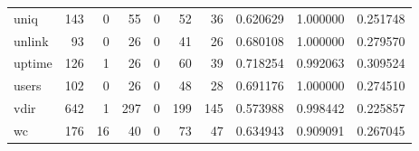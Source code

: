 \begin{longtable}{lrrrrrrrrr}
uniq      &                                                143 &                                                  0 &                                                 55 &                                                  0 &                                                 52 &                                                 36 &                                           0.620629 &                               1.000000 &                             0.251748 \\
unlink    &                                                 93 &                                                  0 &                                                 26 &                                                  0 &                                                 41 &                                                 26 &                                           0.680108 &                               1.000000 &                             0.279570 \\
uptime    &                                                126 &                                                  1 &                                                 26 &                                                  0 &                                                 60 &                                                 39 &                                           0.718254 &                               0.992063 &                             0.309524 \\
users     &                                                102 &                                                  0 &                                                 26 &                                                  0 &                                                 48 &                                                 28 &                                           0.691176 &                               1.000000 &                             0.274510 \\
vdir      &                                                642 &                                                  1 &                                                297 &                                                  0 &                                                199 &                                                145 &                                           0.573988 &                               0.998442 &                             0.225857 \\
wc        &                                                176 &                                                 16 &                                                 40 &                                                  0 &                                                 73 &                                                 47 &                                           0.634943 &                               0.909091 &                             0.267045 \\

\end{longtable}
